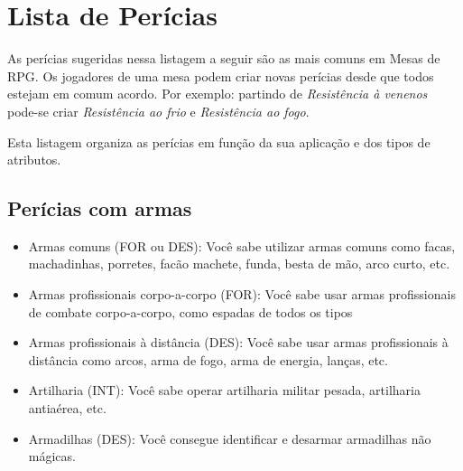 \chapter{\label{apendicePericias}Lista de Perícias}

As perícias sugeridas nessa listagem a seguir são as mais comuns em Mesas de RPG. Os jogadores de uma mesa podem criar novas perícias desde que todos estejam em comum acordo. Por exemplo: partindo de \emph{Resistência à venenos} pode-se criar \emph{Resistência ao frio} e \emph{Resistência ao fogo}. 

Esta listagem organiza as perícias em função da sua aplicação e dos tipos de atributos.

\section{\label{sec:perArmas}Perícias com armas}
\begin{itemize}
	\item Armas comuns (FOR ou DES): Você sabe utilizar armas comuns como facas, machadinhas, porretes, facão machete, funda, besta de mão, arco curto, etc.
	\item Armas profissionais corpo-a-corpo (FOR): Você sabe usar armas profissionais de combate corpo-a-corpo, como espadas de todos os tipos 	
	\item Armas profissionais à distância (DES): Você sabe usar armas profissionais à distância como arcos, arma de fogo, arma de energia, lanças, etc.
	\item Artilharia (INT): Você sabe operar artilharia militar pesada, artilharia antiaérea, etc.
	\item Armadilhas (DES): Você consegue identificar e desarmar armadilhas não mágicas.
\end{itemize}

